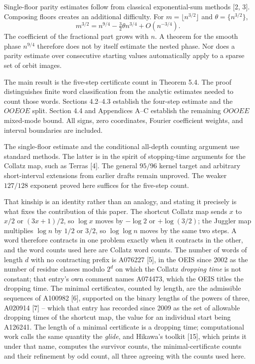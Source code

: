 \documentclass[11pt,a4paper]{article}
\begin{document}
Single-floor parity estimates follow from classical exponential-sum
methods {[}2, 3{]}. Composing floors creates an additional difficulty.
For \(m=\lfloor n^{3/2}\rfloor\) and \(\theta=\{n^{3/2}\}\), \[
m^{3/2}=n^{9/4}-\tfrac32\theta n^{3/4}+O(n^{-3/4}).
\] The coefficient of the fractional part grows with \(n\). A theorem
for the smooth phase \(n^{9/4}\) therefore does not by itself estimate
the nested phase. Nor does a parity estimate over consecutive starting
values automatically apply to a sparse set of orbit images.

The main result is the five-step certificate count in Theorem 5.4. The
proof distinguishes finite word classification from the analytic
estimates needed to count those words. Sections 4.2--4.3 establish the
four-step estimate and the \(OOEOE\) split. Section 4.4 and Appendices
A--C establish the remaining \(OOOEE\) mixed-mode bound. All signs, zero
coordinates, Fourier coefficient weights, and interval boundaries are
included.

The single-floor estimate and the conditional all-depth counting
argument use standard methods. The latter is in the spirit of
stopping-time arguments for the Collatz map, such as Terras {[}4{]}. The
general \(95/96\) kernel target and arbitrary short-interval extensions
from earlier drafts remain unproved. The weaker \(127/128\) exponent
proved here suffices for the five-step count.

That kinship is an identity rather than an analogy, and stating it
precisely is what fixes the contribution of this paper. The shortcut
Collatz map sends \(x\) to \(x/2\) or \((3x+1)/2\), so \(\log x\) moves
by \(-\log2\) or \(+\log(3/2)\); the Juggler map multiplies \(\log n\)
by \(1/2\) or \(3/2\), so \(\log\log n\) moves by the same two steps. A
word therefore contracts in one problem exactly when it contracts in the
other, and the word counts used here are Collatz word counts. The number
of words of length \(d\) with no contracting prefix is A076227 {[}5{]},
in the OEIS since 2002 as the number of residue classes modulo \(2^d\)
on which the Collatz \emph{dropping time} is not constant; that entry's
own comment names A074473, which the OEIS titles the dropping time. The
minimal certificates, counted by length, are the admissible sequences of
A100982 {[}6{]}, supported on the binary lengths of the powers of three,
A020914 {[}7{]} -- which that entry has recorded since 2009 as the set
of allowable dropping times of the shortcut map, the value for an
individual start being A126241. The length of a minimal certificate is a
dropping time; computational work calls the same quantity the
\emph{glide}, and Hikawa's toolkit {[}15{]}, which prints it under that
name, computes the survivor counts, the minimal-certificate counts and
their refinement by odd count, all three agreeing with the counts used
here.
\end{document}
